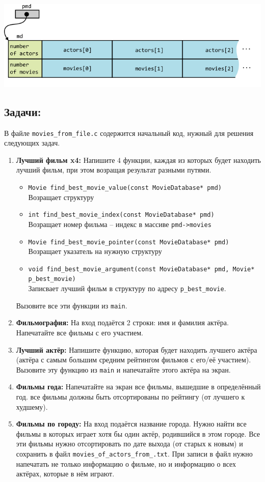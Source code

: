 \documentclass{article}
\begin{document}
\begin{center}
\includegraphics[scale=1]{../images/movie_database_structure.png}
\end{center}

\subsection*{Задачи:}
В файле \texttt{movies\_from\_file.c} содержится начальный код, нужный для решения следующих задач.
\begin{enumerate}
\item \textbf{Лучший фильм x4:} Напишите 4 функции, каждая из которых будет находить лучший фильм, при этом возращая результат разными путями. 
\begin{itemize}
\item \texttt{Movie find\_best\_movie\_value(const MovieDatabase* pmd)}\\
Возращает структуру
\item \texttt{int find\_best\_movie\_index(const MovieDatabase* pmd)} \\
Возращает номер фильма -- индекс в массиве \texttt{pmd->movies}
\item \texttt{Movie find\_best\_movie\_pointer(const MovieDatabase* pmd)}\\
Возращает указатель на нужную структуру
\item \texttt{void find\_best\_movie\_argument(const MovieDatabase* pmd, Movie* p\_best\_movie)}\\
Записвает лучший фильм в структуру по адресу \texttt{p\_best\_movie}.
\end{itemize}
Вызовите все эти функции из \texttt{main}.
\item \textbf{Фильмография:} На вход подаётся 2 строки: имя и фамилия актёра. Напечатайте все фильмы с его участием.
\item \textbf{Лучший актёр:} Напишите функцию, которая будет находить лучшего актёра (актёра с самым большим средним рейтингом фильмов с его/её участием). Вызовите эту функцию из \texttt{main} и напечатайте этого актёра на экран.
\item \textbf{Фильмы года:} Напечатайте на экран все фильмы, вышедшие в определённый год. все фильмы должны быть отсортированы по рейтингу (от лучшего к худшему).
\item \textbf{Фильмы по городу:} На вход подаётся название города. Нужно найти все фильмы в которых играет хотя бы один актёр, родившийся в этом городе. Все эти фильмы нужно отсортировать по дате выхода (от старых к новым) и сохранить в файл \texttt{movies\_of\_actors\_from\_<название города>.txt}. При записи в файл нужно напечатать не только информацию о фильме, но и информацию о всех актёрах, которые в нём играют.
\end{enumerate}
\end{document}
